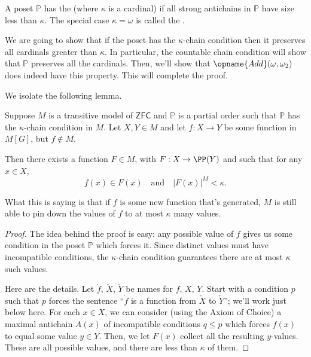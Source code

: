 \documentclass[11pt]{scrreprt}
\newcommand{\ZFC}{\mathsf{ZFC}}
\newcommand{\Po}{\mathbb P}
\begin{document}
\begin{definition}
	A poset $\Po$ has the 
	(where $\kappa$ is a cardinal) if all strong antichains
	in $\Po$ have size less than $\kappa$.
	The special case $\kappa = \omega$ is called the .
\end{definition}

We are going to show that if the poset has the $\kappa$-chain condition
then it preserves all cardinals greater than $\kappa$.
In particular, the countable chain condition will show that $\Po$ preserves all the cardinals.
Then, we'll show that $\opname{Add}(\omega, \omega_2)$ does indeed have this property.
This will complete the proof.

We isolate the following lemma.
\begin{lemma}
	Suppose $M$ is a transitive model of $\ZFC$ and $\Po$ is a partial order
	such that $\Po$ has the $\kappa$-chain condition in $M$.
	Let $X,Y \in M$ and let $f: X \to Y$
	be some function in $M[G]$, but $f \notin M$.

	Then there exists a function $F \in M$, with $F: X \to \PP(Y)$ and such that
	for any $x \in X$,
	\[ f(x) \in F(x) \quad\text{and}\quad \left\lvert F(x) \right\rvert^M < \kappa. \]
\end{lemma}
What this is saying is that if $f$ is some new function that's generated,
$M$ is still able to pin down the values of $f$ to at most $\kappa$ many values.

\begin{proof}
	The idea behind the proof is easy: any possible value of $f$ gives us some condition in
	the poset $\Po$ which forces it.
	Since distinct values must have incompatible conditions,
	the $\kappa$-chain condition guarantees
	there are at most $\kappa$ such values.

	Here are the details.
	Let $\dot f$, $\check X$, $\check Y$ be names for $f$, $X$, $Y$.
	Start with a condition $p$ such that $p$ forces the sentence
	``$\dot f$ is a function from $\check X$ to $\check Y$''; we'll work just below here.
	For each $x \in X$, we can consider (using the Axiom of Choice) a maximal antichain $A(x)$
	of incompatible conditions $q \le p$ which forces $f(x)$ to equal some value $y \in Y$.
	Then, we let $F(x)$ collect all the resulting $y$-values.
	These are all possible values, and there are less than $\kappa$ of them.
\end{proof}
\end{document}
